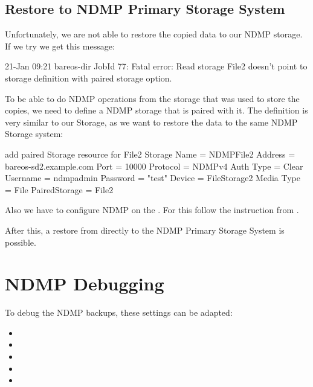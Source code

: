 \subsection{Restore to NDMP Primary Storage System}

Unfortunately, we are not able to restore the copied data to our NDMP storage. If we try we get this message:

\begin{bmessage}{}
21-Jan 09:21 bareos-dir JobId 77: Fatal error: Read storage File2 doesn't point to storage definition with paired storage option.
\end{bmessage}

To be able to do NDMP operations from the storage that was used to store the copies,
we need to define a NDMP storage that is paired with it.
The definition is very similar to our  Storage,
as we want to restore the data to the same NDMP Storage system:

\begin{bconfig}{add paired Storage resource for File2}
Storage {
  Name = NDMPFile2
  Address = bareos-sd2.example.com
  Port = 10000
  Protocol = NDMPv4
  Auth Type = Clear
  Username = ndmpadmin
  Password = "test"
  Device = FileStorage2
  Media Type = File
  PairedStorage = File2
}
\end{bconfig}

Also we have to configure NDMP on the \bareosSd {}.
For this follow the instruction from .

After this, a restore from  directly to the NDMP Primary Storage System is possible.

\section{NDMP Debugging}

To debug the NDMP backups, these settings can be adapted:

\begin{itemize}
\item {}
\item {}
\item {}
\item {}
\item {}
\end{itemize}

